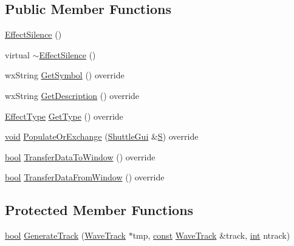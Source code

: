 \subsection*{Public Member Functions}
\begin{DoxyCompactItemize}
\item 
\hyperlink{class_effect_silence_a5ff1d7a1eb5391484abace21010d2382}{Effect\+Silence} ()
\item 
virtual \hyperlink{class_effect_silence_a146eb3978a78ecfdfc8c29eacd601867}{$\sim$\+Effect\+Silence} ()
\item 
wx\+String \hyperlink{class_effect_silence_a1bd27245398de352901c3bca33b4e8f5}{Get\+Symbol} () override
\item 
wx\+String \hyperlink{class_effect_silence_a51e01fbf315852ecff957c766ec4dae6}{Get\+Description} () override
\item 
\hyperlink{_effect_interface_8h_a4809a7bb3fd1a421902a667cc1405d43}{Effect\+Type} \hyperlink{class_effect_silence_ab7bb55c85900ec7e1878a28ba56082db}{Get\+Type} () override
\item 
\hyperlink{sound_8c_ae35f5844602719cf66324f4de2a658b3}{void} \hyperlink{class_effect_silence_aac3beb8e6afc46a64bf5ca062c576150}{Populate\+Or\+Exchange} (\hyperlink{class_shuttle_gui}{Shuttle\+Gui} \&\hyperlink{xlftab_8c_af933676109efed7ab34cea71d748a517}{S}) override
\item 
\hyperlink{mac_2config_2i386_2lib-src_2libsoxr_2soxr-config_8h_abb452686968e48b67397da5f97445f5b}{bool} \hyperlink{class_effect_silence_a5d6605bdf8eedeae4eaa400b75a068ae}{Transfer\+Data\+To\+Window} () override
\item 
\hyperlink{mac_2config_2i386_2lib-src_2libsoxr_2soxr-config_8h_abb452686968e48b67397da5f97445f5b}{bool} \hyperlink{class_effect_silence_a3f0f66219de0def666a2e11f39a02fa4}{Transfer\+Data\+From\+Window} () override
\end{DoxyCompactItemize}
\subsection*{Protected Member Functions}
\begin{DoxyCompactItemize}
\item 
\hyperlink{mac_2config_2i386_2lib-src_2libsoxr_2soxr-config_8h_abb452686968e48b67397da5f97445f5b}{bool} \hyperlink{class_effect_silence_a1faefafd2379392e3628081a7d882437}{Generate\+Track} (\hyperlink{class_wave_track}{Wave\+Track} $\ast$tmp, \hyperlink{getopt1_8c_a2c212835823e3c54a8ab6d95c652660e}{const} \hyperlink{class_wave_track}{Wave\+Track} \&track, \hyperlink{xmltok_8h_a5a0d4a5641ce434f1d23533f2b2e6653}{int} ntrack)
\end{DoxyCompactItemize}
